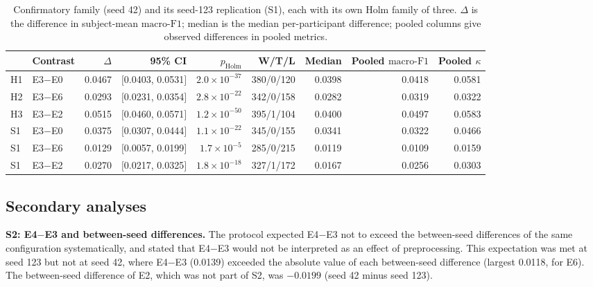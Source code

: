 \documentclass[10pt,a4paper]{article}
\newcommand{\mf}{\ensuremath{\mathrm{macro\text{-}F1}}}
\newcommand{\ci}{95\% CI}
\begin{document}
\begin{table}[H]
\centering\small
\caption{Confirmatory family (seed 42) and its seed-123 replication (S1), each with its own Holm
family of three. $\Delta$ is the difference in subject-mean \mf; median is the median per-participant
difference; pooled columns give observed differences in pooled metrics.}
\label{tab:sup_holdout_confirmatory}
\begin{tabular}{llrrrrrrr}
\toprule
 & Contrast & $\Delta$ & \ci & $p_{\mathrm{Holm}}$ & W/T/L & Median & Pooled \mf & Pooled $\kappa$ \\
\midrule
H1 & E3$-$E0 & 0.0467 & $[$0.0403, 0.0531$]$ & $2.0\times10^{-37}$ & 380/0/120 & 0.0398 & 0.0418 & 0.0581 \\
H2 & E3$-$E6 & 0.0293 & $[$0.0231, 0.0354$]$ & $2.8\times10^{-22}$ & 342/0/158 & 0.0282 & 0.0319 & 0.0322 \\
H3 & E3$-$E2 & 0.0515 & $[$0.0460, 0.0571$]$ & $1.2\times10^{-50}$ & 395/1/104 & 0.0400 & 0.0497 & 0.0583 \\
\addlinespace
S1 & E3$-$E0 & 0.0375 & $[$0.0307, 0.0444$]$ & $1.1\times10^{-22}$ & 345/0/155 & 0.0341 & 0.0322 & 0.0466 \\
S1 & E3$-$E6 & 0.0129 & $[$0.0057, 0.0199$]$ & $1.7\times10^{-5}$ & 285/0/215 & 0.0119 & 0.0109 & 0.0159 \\
S1 & E3$-$E2 & 0.0270 & $[$0.0217, 0.0325$]$ & $1.8\times10^{-18}$ & 327/1/172 & 0.0167 & 0.0256 & 0.0303 \\
\bottomrule
\end{tabular}
\end{table}

\subsection*{Secondary analyses}

\textbf{S2: E4$-$E3 and between-seed differences.} The protocol expected E4$-$E3 not to exceed
the between-seed differences of the same configuration systematically, and stated that E4$-$E3 would
not be interpreted as an effect of preprocessing. This expectation was met at seed 123 but not at seed
42, where E4$-$E3 (0.0139) exceeded the absolute value of each between-seed difference (largest
0.0118, for E6). The between-seed difference of E2, which was not part of S2, was $-0.0199$
(seed 42 minus seed 123).
\end{document}
